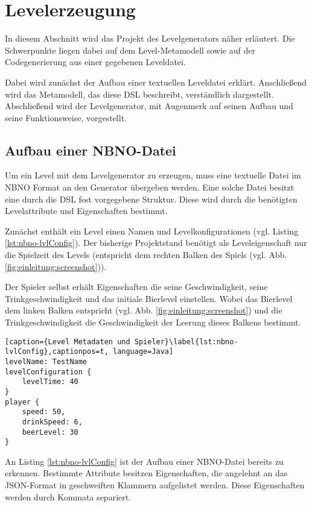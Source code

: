 \section{Levelerzeugung}\label{sec:levelerzeugung}

In diesem Abschnitt wird das Projekt des Levelgenerators näher erläutert. Die Schwerpunkte liegen dabei auf dem Level-Metamodell sowie auf der Codegenerierung aus einer gegebenen Leveldatei. 
 
Dabei wird zunächst der Aufbau einer textuellen Leveldatei erklärt.
Anschließend wird das Metamodell, das diese DSL beschreibt, verständlich dargestellt.
Abschließend wird der Levelgenerator, mit Augenmerk auf seinen Aufbau und seine Funktionsweise, vorgestellt.


\subsection{Aufbau einer NBNO-Datei}
Um ein Level mit dem Levelgenerator zu erzeugen, muss eine textuelle Datei im NBNO Format an den Generator übergeben werden. Eine solche Datei besitzt eine durch die DSL fest vorgegebene Struktur. Diese wird durch die benötigten Levelattribute und Eigenschaften bestimmt.

Zunächst enthält ein Level einen Namen und Levelkonfigurationen (vgl. Listing \ref{lst:nbno-lvlConfig}). Der bisherige Projektstand benötigt als Leveleigenschaft nur die Spielzeit des Levels (entspricht dem rechten Balken des Spiels (vgl. Abb. \ref{fig:einleitung:screenshot})).

Der Spieler selbst erhält Eigenschaften die seine Geschwindigkeit, seine Trinkgeschwindigkeit und das initiale Bierlevel einstellen. Wobei das Bierlevel dem linken Balken entspricht (vgl. Abb. \ref{fig:einleitung:screenshot}) und die Trinkgeschwindigkeit die Geschwindigkeit der Leerung dieses Balkens bestimmt.

\begin{lstlisting}[caption={Level Metadaten und Spieler}\label{lst:nbno-lvlConfig},captionpos=t, language=Java]
levelName: TestName
levelConfiguration {
    levelTime: 40
}
player {
    speed: 50,
    drinkSpeed: 6,
    beerLevel: 30
}
\end{lstlisting}

An Listing \ref{lst:nbno-lvlConfig} ist der Aufbau einer NBNO-Datei bereits zu erkennen.
Bestimmte Attribute besitzen Eigenschaften, die angelehnt an das JSON-Format in geschweiften Klammern aufgelistet werden.
Diese Eigenschaften werden durch Kommata separiert.

